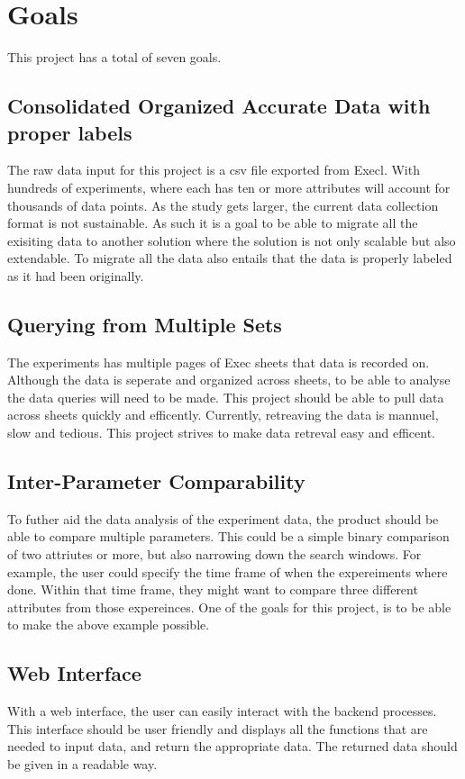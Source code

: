 \documentclass{article}
\begin{document}
\section{Goals}
This project has a total of seven goals.
\subsection*{Consolidated Organized Accurate Data with proper labels}
The raw data input for this project is a csv file exported from Execl. With hundreds of experiments, 
where each has ten or more attributes will account for thousands of data points. As the study gets larger, the current data collection format is not sustainable. 
As such it is a goal to be able to migrate all the exisiting data to another solution where the solution is not only scalable but also extendable.
To migrate all the data also entails that the data is properly labeled as it had been originally. 

\subsection*{Querying from Multiple Sets}
The experiments has multiple pages of Exec sheets that data is recorded on. Although the data is seperate and organized across sheets, to be able to analyse the data queries will need to be made. 
This project should be able to pull data across sheets quickly and efficently. Currently, retreaving the data is mannuel, slow and tedious. 
This project strives to make data retreval easy and efficent.  

\subsection*{Inter-Parameter Comparability}
To futher aid the data analysis of the experiment data, the product should be able to compare multiple parameters. 
This could be a simple binary comparison of two attriutes or more, but also narrowing down the search windows. 
For example, the user could specify the time frame of when the expereiments where done. Within that time frame, they might want to compare three different attributes from those expereinces. 
One of the goals for this project, is to be able to make the above example possible. 

\subsection*{Web Interface}
With a web interface, the user can easily interact with the backend processes.
This interface should be user friendly and displays all the functions that are needed to input data, and return the appropriate data. 
The returned data should be given in a readable way.
\end{document}

